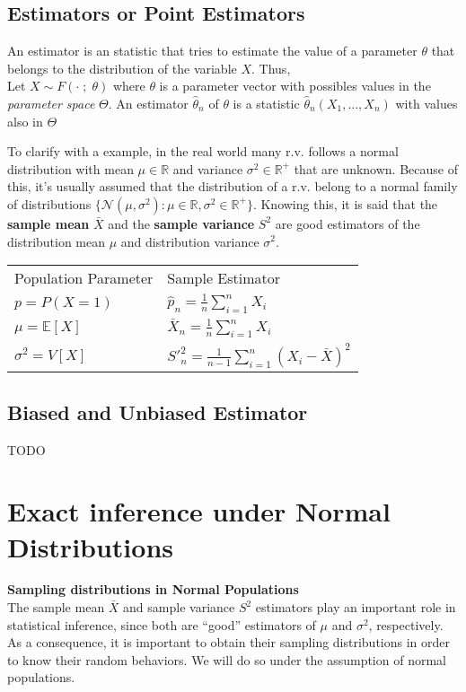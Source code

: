\subsection{Estimators or Point Estimators}
An estimator is an statistic that tries to estimate the value of a parameter $\theta$ that belongs to the distribution of the variable
$X$. Thus,\\

Let $X \sim F(\cdot\;;\;\theta)$ where $\theta$ is a parameter vector with possibles values in the \textit{parameter space} $\Theta$.
An estimator $\hat{\theta}_n$ of $\theta$ is a statistic $\hat{\theta}_n(X_1,\dots,X_n)$ with values also in $\Theta$ 

To clarify with a example, in the real world many r.v. follows a normal distribution with mean $\mu \in \mathbb{R}$ and variance 
$\sigma^2 \in \mathbb{R}^+$ that are unknown. Because of this, it's usually assumed that the distribution of a r.v. belong to a 
normal family of distributions $\{\mathcal{N}(\mu,\sigma^2):\mu\in\mathbb{R},\sigma^2\in \mathbb{R^+} \}$. Knowing this, it is said 
that the \textbf{sample mean} $\bar{X}$ and the \textbf{sample variance} $S^2$ are good estimators of the distribution mean $\mu$ 
and distribution variance $\sigma^2$.

\begin{table}[H]
    \centering
    \begin{tabular}{ll}
    Population Parameter    & Sample Estimator                          \\
    $p = P(X=1)$            & $\hat{p}_n = \frac{1}{n}\sum_{i=1}^n X_i$ \\
    $\mu = \mathbb{E}[X]$   & $\bar{X}_n = \frac{1}{n}\sum_{i=1}^n X_i$ \\
    $\sigma^2 = V[X]$       & $S'^2_n = \frac{1}{n-1}\sum_{i=1}^{n} (X_i-\bar{X})^2 $
    \end{tabular}
\end{table}

\subsection{Biased and Unbiased Estimator}
TODO

\section{Exact inference under Normal Distributions}
\textbf{Sampling distributions in Normal Populations}\\
The sample mean $\bar{X}$ and sample variance $S^2$ estimators play an important role in statistical inference, since both are “good” estimators
of $\mu$ and $\sigma^2$, respectively. As a consequence, it is important to obtain their sampling distributions in order to know their random behaviors. 
We will do so under the assumption of normal populations.

